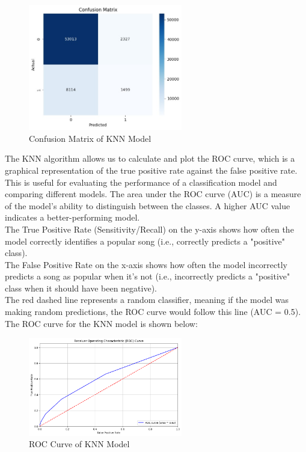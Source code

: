 \begin{figure}[h] 
    \centering 
    \includegraphics[width=0.6\textwidth]{media/knn-confusion_matrix.jpg}
    \caption{Confusion Matrix of KNN Model}

\end{figure}

\newpage

The KNN algorithm allows us to calculate and plot the ROC curve, which is a graphical representation of the true positive rate against the false positive rate. This is useful for evaluating the performance of a classification model and comparing different models. The area under the ROC curve (AUC) is a measure of the model's ability to distinguish between the classes. A higher AUC value indicates a better-performing model.\\
The True Positive Rate (Sensitivity/Recall) on the y-axis shows how often the model correctly identifies a popular song (i.e., correctly predicts a "positive" class).\\
The False Positive Rate on the x-axis shows how often the model incorrectly predicts a song as popular when it's not (i.e., incorrectly predicts a "positive" class when it should have been negative).\\
The red dashed line represents a random classifier, meaning if the model was making random predictions, the ROC curve would follow this line (AUC = 0.5).\\
The ROC curve for the KNN model is shown below:

\begin{figure} [H]
    \centering
    \includegraphics[width=0.6\textwidth]{media/roc_curve.png}
    \caption{ROC Curve of KNN Model}
    \label{fig:knn_roc_curve}
\end{figure}

